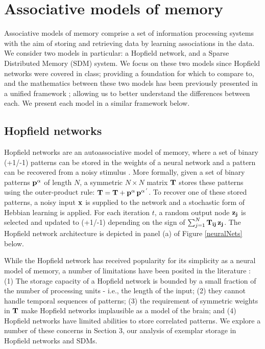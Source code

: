 \documentclass[10pt,letterpaper]{article}
\begin{document}
\section{Associative models of memory}

Associative models of memory comprise a set of information processing systems with the aim of storing and retrieving data by learning associations in the data. We consider two models in particular: a Hopfield network, and a Sparse Distributed Memory (SDM) system. We focus on these two models since Hopfield networks were covered in class; providing a foundation for which to compare to, and the mathematics between these two models has been previously presented in a unified framework \cite{Keeler1988}; allowing us to better understand the differences between each.  We present each model in a similar framework below. %

\subsection{Hopfield networks}

Hopfield networks are an autoassociative model of memory, where a set of binary (+1/-1) patterns can be stored in the weights of a neural network and a pattern can be recovered from a noisy stimulus \cite{Hopfield1982}. More formally, given a set of binary patterns $\bf{p}^{\alpha}$ of length $N$, a symmetric $N \times N$ matrix $\bf{T}$ stores these patterns using the outer-product rule: $\bf{T} = \bf{T} + \bf{p}^{\alpha}\,\bf{p}^{\alpha\,'}$. To recover one of these stored patterns, a noisy input $\bf{x}$ is supplied to the network and a stochastic form of Hebbian learning is applied. For each  iteration $t$, a random output node $\bf{z}_{j}$ is selected and updated to (+1/-1) depending on the sign of $\sum_{j=1}^{N} \bf{T}_{ij}\,\bf{z}_{j}$. The Hopfield network architecture is depicted in panel (a) of Figure \ref{neuralNets} below.

While the Hopfield network has received popularity for its simplicity as a neural model of memory, a number of limitations have been posited in the literature \cite{Keeler1988}: (1) The storage capacity of a Hopfield network is bounded by a small fraction of the number of processing units - i.e., the length of the input; (2) they cannot handle temporal sequences of patterns; (3) the requirement of symmetric weights in $\bf{T}$ make Hopfield networks  implausible as a model of the brain; and (4) Hopfield networks have limited abilities to store correlated patterns. We explore a number of these concerns in Section 3, our analysis of exemplar storage in Hopfield networks and SDMs.
\end{document}
